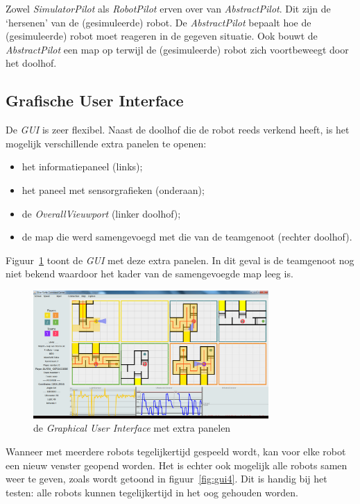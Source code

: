 \documentclass[eind]{penoverslag}
\begin{document}
Zowel \textit{SimulatorPilot} als \textit{RobotPilot} erven over van \textit{AbstractPilot}. Dit zijn de `hersenen' van de (gesimuleerde) robot. De \textit{AbstractPilot} bepaalt hoe de (gesimuleerde) robot moet reageren in de gegeven situatie. Ook bouwt de \textit{AbstractPilot} een map op terwijl de (gesimuleerde) robot zich voortbeweegt door het doolhof.

\subsection{Grafische User Interface}
\label{ssec:GUI}
De \textit{GUI} is zeer flexibel. Naast de doolhof die de robot reeds verkend heeft, is het mogelijk verschillende extra panelen te openen:

\begin{itemize}
	\item het informatiepaneel (links);
	\item het paneel met sensorgrafieken (onderaan);
	\item de \textit{OverallVieuwport} (linker doolhof);
	\item de map die werd samengevoegd met die van de teamgenoot (rechter doolhof).
\end{itemize}

Figuur~\ref{fig:guiAll} toont de \textit{GUI} met deze extra panelen. In dit geval is de teamgenoot nog niet bekend waardoor het kader van de samengevoegde map leeg is.\\

\begin{figure}[h]
\centering
	\includegraphics[width=0.8\textwidth]{guiALL}
\caption{de \textit{Graphical User Interface} met extra panelen}
\label{fig:guiAll}
\end{figure}

Wanneer met meerdere robots tegelijkertijd gespeeld wordt, kan voor elke robot een nieuw venster geopend worden. Het is echter ook mogelijk alle robots samen weer te geven, zoals wordt getoond in figuur~\ref{fig:gui4}. Dit is handig bij het testen: alle robots kunnen tegelijkertijd in het oog gehouden worden.
\end{document}
